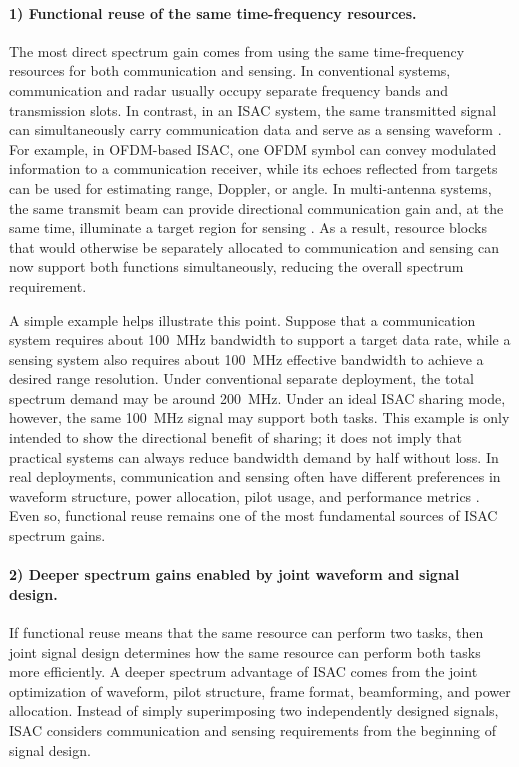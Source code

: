 \paragraph{1) Functional reuse of the same time-frequency resources.}
The most direct spectrum gain comes from using the same time-frequency resources for both communication and sensing. In conventional systems, communication and radar usually occupy separate frequency bands and transmission slots. In contrast, in an ISAC system, the same transmitted signal can simultaneously carry communication data and serve as a sensing waveform \cite{Liu2022ISAC,Hassanien2015dual,Sturm2011WaveformDesign}. For example, in OFDM-based ISAC, one OFDM symbol can convey modulated information to a communication receiver, while its echoes reflected from targets can be used for estimating range, Doppler, or angle. In multi-antenna systems, the same transmit beam can provide directional communication gain and, at the same time, illuminate a target region for sensing \cite{Liu2020JointRadarComm,Gonzalez2024integrated}. As a result, resource blocks that would otherwise be separately allocated to communication and sensing can now support both functions simultaneously, reducing the overall spectrum requirement.

A simple example helps illustrate this point. Suppose that a communication system requires about 100~MHz bandwidth to support a target data rate, while a sensing system also requires about 100~MHz effective bandwidth to achieve a desired range resolution. Under conventional separate deployment, the total spectrum demand may be around 200~MHz. Under an ideal ISAC sharing mode, however, the same 100~MHz signal may support both tasks. This example is only intended to show the directional benefit of sharing; it does not imply that practical systems can always reduce bandwidth demand by half without loss. In real deployments, communication and sensing often have different preferences in waveform structure, power allocation, pilot usage, and performance metrics \cite{Liu2020JointRadarComm,Liu2022ISAC}. Even so, functional reuse remains one of the most fundamental sources of ISAC spectrum gains.

\paragraph{2) Deeper spectrum gains enabled by joint waveform and signal design.}
If functional reuse means that the same resource can perform two tasks, then joint signal design determines how the same resource can perform both tasks more efficiently. A deeper spectrum advantage of ISAC comes from the joint optimization of waveform, pilot structure, frame format, beamforming, and power allocation. Instead of simply superimposing two independently designed signals, ISAC considers communication and sensing requirements from the beginning of signal design.

